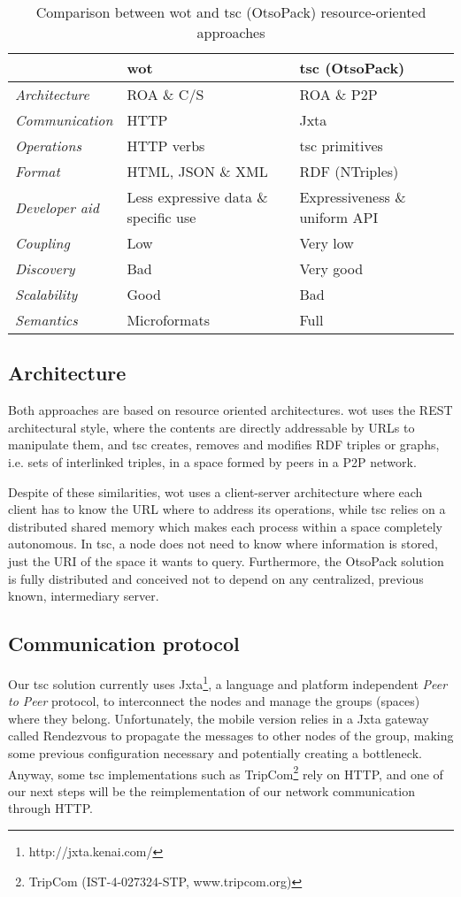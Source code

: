 \begin{table}[ht!]
\centering
\caption {Comparison between \ac{wot} and \ac{tsc} (OtsoPack) resource-oriented approaches}
\begin{tabular}{|l|p{}|p{}|}
\hline
& \ac{wot} & \ac{tsc} (OtsoPack) \\
\hline
\textit{Architecture} & ROA \& C/S & ROA \& P2P \\
\textit{Communication} & HTTP & Jxta \\
\textit{Operations} & HTTP verbs & \ac{tsc} primitives \\
\textit{Format} & HTML, JSON \& XML & RDF (NTriples) \\ %
\textit{Developer aid} & Less expressive data \& specific use & Expressiveness \& uniform API \\
\textit{Coupling} & Low & Very low \\ %
\textit{Discovery} & Bad & Very good \\
\textit{Scalability} & Good & Bad \\
\textit{Semantics} & Microformats & Full \\
\hline
\end{tabular}
\label{tab:comparison}
\end{table}

\subsection{Architecture}
Both approaches are based on resource oriented architectures. \ac{wot} uses the REST architectural style, where the contents are directly addressable by
URLs to manipulate them, and \ac{tsc} creates, removes and modifies RDF triples or graphs, i.e. sets of interlinked triples, in a space formed by peers
in a P2P network.

Despite of these similarities, \ac{wot} uses a client-server architecture where each client has to know the URL where to address its operations, while
\ac{tsc} relies on a distributed shared memory which makes each process within a space completely autonomous. In \ac{tsc}, a node does not need to know where
information is stored, just the URI of the space it wants to query. Furthermore, the OtsoPack solution is fully distributed and conceived not to depend
on any centralized, previous known, intermediary server.

\subsection{Communication protocol}
Our \ac{tsc} solution currently uses Jxta\footnote{http://jxta.kenai.com/}, a language and platform independent \textit{Peer to Peer} protocol, to
interconnect the nodes and manage the groups (spaces) where they belong. Unfortunately, the mobile version relies in a Jxta gateway called Rendezvous
to propagate the messages to other nodes of the group, making some previous configuration necessary and potentially creating a bottleneck. Anyway,
some \ac{tsc} implementations such as TripCom\footnote{TripCom (IST-4-027324-STP, www.tripcom.org)} rely on HTTP, and one of our next steps will be the
reimplementation of our network communication through HTTP.

